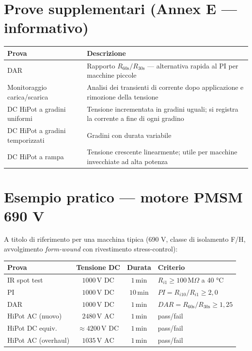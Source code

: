 \documentclass[a4paper,11pt]{article}
\begin{document}
\section{Prove supplementari (Annex E — informativo)}

\begin{center}
\begin{tabularx}{\linewidth}{lX}
\toprule
\textbf{Prova} & \textbf{Descrizione} \\
\midrule
DAR                    & Rapporto $R_{60\text{s}}/R_{30\text{s}}$ — alternativa rapida al PI per macchine piccole \\
Monitoraggio carica/scarica & Analisi dei transienti di corrente dopo applicazione e rimozione della tensione \\
DC HiPot a gradini uniformi & Tensione incrementata in gradini uguali; si registra la corrente a fine di ogni gradino \\
DC HiPot a gradini temporizzati & Gradini con durata variabile \\
DC HiPot a rampa       & Tensione crescente linearmente; utile per macchine invecchiate ad alta potenza \\
\bottomrule
\end{tabularx}
\end{center}

\section{Esempio pratico — motore PMSM 690 V}

A titolo di riferimento per una macchina tipica (690 V, classe di isolamento F/H, avvolgimento \emph{form-wound} con rivestimento stress-control):

\begin{center}
\begin{tabular}{lccl}
\toprule
\textbf{Prova} & \textbf{Tensione DC} & \textbf{Durata} & \textbf{Criterio} \\
\midrule
IR spot test  & $1000\,\text{V DC}$ & $1\,\text{min}$  & $R_{i1} \geq 100\,\text{M}\Omega$ a 40 °C \\
PI            & $1000\,\text{V DC}$ & $10\,\text{min}$ & $PI = R_{i10}/R_{i1} \geq 2{,}0$ \\
DAR           & $1000\,\text{V DC}$ & $1\,\text{min}$  & $DAR = R_{60\text{s}}/R_{30\text{s}} \geq 1{,}25$ \\
HiPot AC (nuovo) & $2480\,\text{V AC}$ & $1\,\text{min}$ & pass/fail \\
HiPot DC equiv.  & $\approx 4200\,\text{V DC}$ & $1\,\text{min}$ & pass/fail \\
HiPot AC (overhaul) & $1035\,\text{V AC}$ & $1\,\text{min}$ & pass/fail \\
\bottomrule
\end{tabular}
\end{center}
\end{document}
